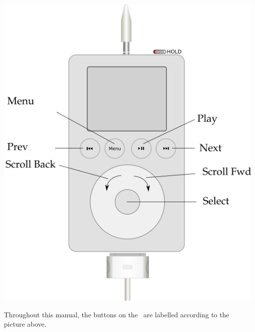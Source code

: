 \begin{center}
{    {\includegraphics{rockbox_interface/images/ipod3g-front.png}}
 }
\end{center}

Throughout this manual, the buttons on the \dap\ are labelled according to the
picture above.

